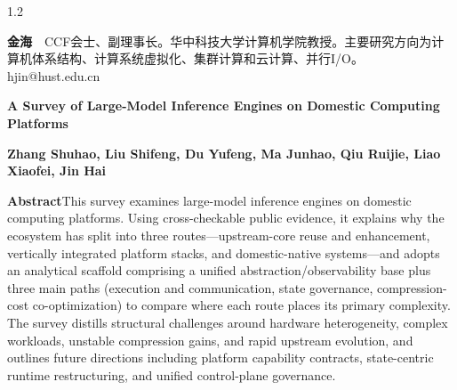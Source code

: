 \documentclass[UTF8,a4paper,12pt]{ctexart}
\begin{document}
\begin{spacing}{1.2}









\vspace{1em}
\noindent\begin{minipage}{\linewidth}
\noindent %
\textbf{金海}~~CCF会士、副理事长。华中科技大学计算机学院教授。主要研究方向为计算机体系结构、计算系统虚拟化、集群计算和云计算、并行I/O。hjin@hust.edu.cn
\end{minipage}

\vspace{1.2em}

\begingroup
\sloppy


\endgroup

\vspace{1.5em}
\noindent\textbf{\large A Survey of Large-Model Inference Engines on Domestic Computing Platforms}

\vspace{0.6em}
\noindent\textbf{Zhang Shuhao, Liu Shifeng, Du Yufeng, Ma Junhao, Qiu Ruijie, Liao Xiaofei, Jin Hai}

\vspace{0.6em}
\noindent\textbf{Abstract}\quad This survey examines large-model inference engines on domestic computing platforms. Using cross-checkable public evidence, it explains why the ecosystem has split into three routes---upstream-core reuse and enhancement, vertically integrated platform stacks, and domestic-native systems---and adopts an analytical scaffold comprising a unified abstraction/observability base plus three main paths (execution and communication, state governance, compression-cost co-optimization) to compare where each route places its primary complexity. The survey distills structural challenges around hardware heterogeneity, complex workloads, unstable compression gains, and rapid upstream evolution, and outlines future directions including platform capability contracts, state-centric runtime restructuring, and unified control-plane governance.


\end{spacing}
\end{document}
